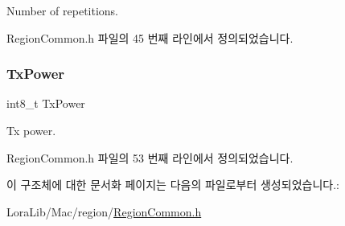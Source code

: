 Number of repetitions. 

Region\+Common.\+h 파일의 45 번째 라인에서 정의되었습니다.

\mbox{\label{structs_region_common_link_adr_params_a037b4f849fa8ed4aa1d3c58aef2b28ec}} 
\subsubsection{\texorpdfstring{Tx\+Power}{TxPower}}
{\footnotesize\ttfamily int8\+\_\+t Tx\+Power}

Tx power. 

Region\+Common.\+h 파일의 53 번째 라인에서 정의되었습니다.



이 구조체에 대한 문서화 페이지는 다음의 파일로부터 생성되었습니다.\+:\begin{DoxyCompactItemize}
\item 
Lora\+Lib/\+Mac/region/\mbox{\hyperlink{_region_common_8h}{Region\+Common.\+h}}\end{DoxyCompactItemize}

